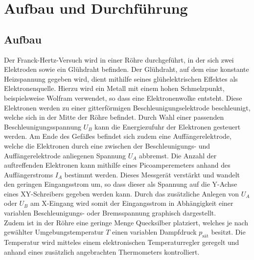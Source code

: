 \section{Aufbau und Durchführung}
\subsection{Aufbau}
\label{sec:Aufbau}

Der Franck-Hertz-Versuch wird in einer Röhre durchgeführt, in der sich zwei Elektroden sowie ein Glühdraht befinden.
Der Glühdraht, auf dem eine konstante Heizspannung gegeben wird, dient mithilfe seines glühelektrischen Effektes als Elektronenquelle.
Hierzu wird ein Metall mit einem hohen Schmelzpunkt, beispielsweise Wolfram verwendet, so dass eine Elektronenwolke entsteht.
Diese Elektronen werden zu einer gitterförmigen Beschleunigungselektrode beschleunigt, welche sich in der Mitte der Röhre befindet.
Durch Wahl einer passenden Beschleunigungsspannung $U_B$ kann die Energiezufuhr der Elektronen gesteuert werden.
Am Ende des Gefäßes befindet sich zudem eine Auffängerelektrode, welche die Elektronen durch eine zwischen der Beschleunigungs- und Auffängerelektrode anliegenen Spannung $U_A$ abbremst.
Die Anzahl der auftreffenden Elektronen kann mithilfe eines Picoamperemeters anhand des Auffängerstroms $I_A$ bestimmt werden.
Dieses Messgerät verstärkt und wandelt den geringen Eingangsstrom um, so dass dieser als Spannung auf die Y-Achse eines XY-Schreibers gegeben werden kann.
Durch das zusätzliche Anlegen von $U_A$ oder $U_B$ am X-Eingang wird somit der Eingangsstrom in Abhängigkeit einer variablen Beschleunigungs- oder Bremsspannung graphisch dargestellt.
\\

Zudem ist in der Röhre eine geringe Menge Quecksilber platziert, welches je nach gewählter Umgebungstemperatur $T$ einen variablen Dampfdruck $p_\text{sät}$ besitzt.
Die Temperatur wird mitteles einem elektronischen Temperaturregler geregelt und anhand eines zusätzlich angebrachten Thermometers kontrolliert.
